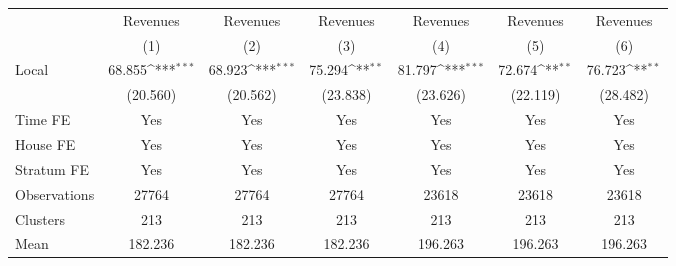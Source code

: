{
\def\sym#1{\ifmmode^{#1}\else\(^{#1}\)\fi}
\begin{tabular}{l*{6}{c}}
\hline\hline
                &\multicolumn{1}{c}{Revenues}&\multicolumn{1}{c}{Revenues}&\multicolumn{1}{c}{Revenues}&\multicolumn{1}{c}{Revenues}&\multicolumn{1}{c}{Revenues}&\multicolumn{1}{c}{Revenues}\\
                &\multicolumn{1}{c}{(1)}         &\multicolumn{1}{c}{(2)}         &\multicolumn{1}{c}{(3)}         &\multicolumn{1}{c}{(4)}         &\multicolumn{1}{c}{(5)}         &\multicolumn{1}{c}{(6)}         \\
\hline
Local           &   68.855\sym{***}&   68.923\sym{***}&   75.294\sym{**} &   81.797\sym{***}&   72.674\sym{**} &   76.723\sym{**} \\
                & (20.560)         & (20.562)         & (23.838)         & (23.626)         & (22.119)         & (28.482)         \\
Time FE         &      Yes         &      Yes         &      Yes         &      Yes         &      Yes         &      Yes         \\
House FE        &      Yes         &      Yes         &      Yes         &      Yes         &      Yes         &      Yes         \\
Stratum FE      &      Yes         &      Yes         &      Yes         &      Yes         &      Yes         &      Yes         \\
\hline
Observations    &    27764         &    27764         &    27764         &    23618         &    23618         &    23618         \\
Clusters        &      213         &      213         &      213         &      213         &      213         &      213         \\
Mean            &  182.236         &  182.236         &  182.236         &  196.263         &  196.263         &  196.263         \\
\hline\hline
\end{tabular}
}
